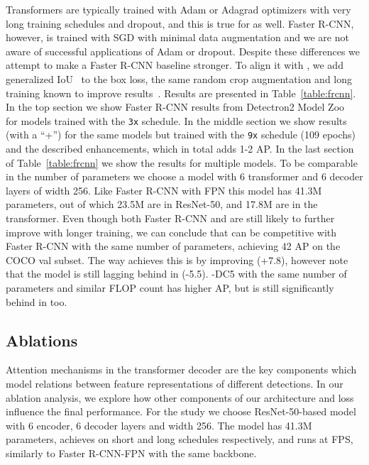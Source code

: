 Transformers are typically trained with Adam or Adagrad optimizers with
very long training schedules and dropout, and this is true for \detr as well.
Faster R-CNN, however, is trained with SGD with minimal data augmentation
and we are not aware of successful applications of Adam or dropout.
Despite these differences we attempt to make a Faster R-CNN baseline stronger.
To align it with \detr,
we add generalized IoU~\cite{Rezatofighi_2018_CVPR} to the box loss, the same random crop augmentation and long training known to
improve results~\cite{He2018RethinkingIP}.
Results are presented in Table~\ref{table:frcnn}.
In the top section we show Faster R-CNN results from Detectron2 Model Zoo~\cite{wu2019detectron2}
for models trained with the \texttt{3x} schedule.
In the middle section we show results (with a ``+'') for the same models
but trained with the \texttt{9x} schedule (109 epochs) and the described enhancements,
which in total adds 1-2 AP. In the last section of Table~\ref{table:frcnn}
we show the results for multiple \detr models.
To be comparable in the number of parameters we choose a model
with 6 transformer and 6 decoder layers of width 256.
Like Faster R-CNN with FPN this model has 41.3M parameters,
out of which 23.5M are in ResNet-50, and 17.8M are in the transformer.
Even though both Faster R-CNN and \detr are still likely to
further improve with longer training,
we can conclude that  can be competitive with Faster R-CNN
with the same number of parameters, achieving 42 AP on the COCO val subset.
{The way \detr achieves this is by improving  (+7.8),
however note that the model is still lagging behind in  (-5.5).
\detr-DC5 with the same number of parameters and similar FLOP count has higher AP,
but is still significantly behind in  too.}



\subsection{Ablations}

Attention mechanisms in the transformer decoder are the key components which model relations between feature representations of different detections. In our ablation analysis, we explore how other components of our architecture and loss influence the final performance. For the study we choose ResNet-50-based \detr model with 6 encoder, 6 decoder layers and width 256.
The model has 41.3M parameters,
achieves  on short and long schedules respectively,
and runs at  FPS, similarly to Faster R-CNN-FPN with the same backbone.
